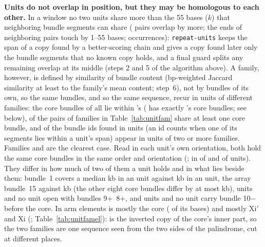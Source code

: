 \textbf{Units do not overlap in position, but they may be homologous to each other.} In a window no two units share more than the 55 bases ($k$) that neighboring bundle segments can share
(\ufPosOv{} pairs overlap by more; the ends of \ufKmerOv{} neighboring pairs touch by 1--55 bases; \ufOcc{} occurrences): \texttt{repeat-units} keeps the span of a copy found by a
better-scoring chain and gives a copy found later only the bundle segments that no known copy holds, and a final guard
splits any remaining overlap at its middle (steps 2 and 5 of the algorithm above). A family, however, is
defined by similarity of bundle content (bp-weighted Jaccard similarity at least \ufJac{} to the family's mean content; step~6), not by bundles of its own, so the
same bundles, and so the same sequence, recur in units of different families: the core bundles of \ufInA{} all lie
within 's ( has exactly 's \ufABshared{} core bundles; see below), \ufPairsShare{} of the \ufPairs{} pairs of families in
Table~\ref{tab:unitfam} share at least one core bundle, and \ufBidsMulti{} of the \ufBids{} bundle ids found in units (an id counts when one of its segments lies within a unit's span)
appear in units of two or more families. Families  and  are the clearest case. Read in each unit's own orientation, both hold the same \ufABshared{} core
bundles in the same order and orientation (\ufABorder; in \ufAinOrd{} of \ufAn{}  and \ufBinOrd{} of \ufBn{}  units).
They differ in how much of two of them a unit holds and in what lies beside them: bundle~1 covers a median \ufAbOneA{} kb
in an  unit against \ufAbOneB{} kb in an  unit, the array bundle~15 \ufAbArrA{} against \ufAbArrB{} kb (the other
eight core bundles differ by at most \ufAbOtherMax{} kb), \ufBstartK{}  units and no  unit open with bundles 9+~8+,
and \ufAtenM{}  units and no  unit carry bundle 10$-$ before the core. In arm elements  is mostly the core
(\feACore{} of its bases) and  mostly Xi$'$ and Xi (\feBXi; Table~\ref{tab:unitfamel}):  is the inverted copy of the core's
inner part, so the two families are one sequence seen from the two sides of the palindrome, cut at different places.

